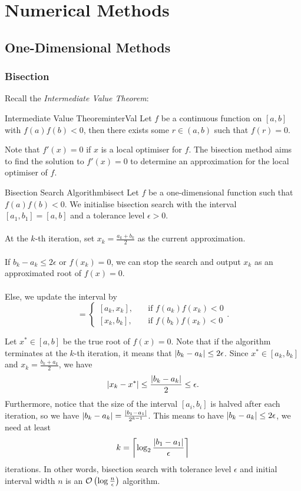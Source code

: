 \documentclass[math, code]{amznotes}
\theoremstyle{remark}
\begin{document}
\chapter{Numerical Methods}
\section{One-Dimensional Methods}
\subsection{Bisection}
Recall the \textit{Intermediate Value Theorem}:
\begin{thmbox}{Intermediate Value Theorem}{interVal}
    Let $f$ be a continuous function on $[a, b]$ with $f(a)f(b) < 0$, then there exists some $r \in (a, b)$ such that $f(r) = 0$.
\end{thmbox}
Note that $f'(x) = 0$ if $x$ is a local optimiser for $f$. The bisection method aims to find the solution to $f'(x) = 0$ to determine an approximation for the local optimiser of $f$.
\begin{tecbox}{Bisection Search Algorithm}{bisect}
    Let $f$ be a one-dimensional function such that $f(a)f(b) < 0$. We initialise bisection search with the interval $[a_1, b_1] = [a, b]$ and a tolerance level $\epsilon > 0$.
    \\\\
    At the $k$-th iteration, set $x_k = \frac{a_k + b_k}{2}$ as the current approximation. 
    \\\\
    If $b_k - a_k \leq 2\epsilon$ or $f(x_k) = 0$, we can stop the search and output $x_k$ as an approximated root of $f(x) = 0$.
    \\\\
    Else, we update the interval by
    \begin{equation*}
        [a_{k + 1}, b_{k + 1}] = \begin{cases}
            [a_k, x_k], & \quad\textrm{if } f(a_k)f(x_k) < 0 \\
            [x_k, b_k], & \quad\textrm{if } f(b_k)f(x_k) < 0
        \end{cases}.
    \end{equation*} 
\end{tecbox}
Let $x^* \in [a, b]$ be the true root of $f(x) = 0$. Note that if the algorithm terminates at the $k$-th iteration, it means that ${\left\lvert {b_k - a_k} \right\rvert} \leq 2\epsilon$. Since $x^* \in [a_k, b_k]$ and $x_k = \frac{b_k + a_k}{2}$, we have
\begin{equation*}
    {\left\lvert {x_k - x^*} \right\rvert} \leq \frac{{\left\lvert {b_k - a_k} \right\rvert}}{2} \leq \epsilon.
\end{equation*}
Furthermore, notice that the size of the interval $[a_i, b_i]$ is halved after each iteration, so we have ${\left\lvert {b_k - a_k} \right\rvert} = \frac{{\left\lvert {b_1 - a_1} \right\rvert}}{2^{k - 1}}$. This means to have ${\left\lvert {b_k - a_k} \right\rvert} \leq 2\epsilon$, we need at least
\begin{equation*}
    k = \left\lceil\log_2\frac{{\left\lvert {b_1 - a_1} \right\rvert}}{\epsilon}\right\rceil
\end{equation*}
iterations. In other words, bisection search with tolerance level $\epsilon$ and initial interval width $n$ is an $\mathcal{O}\left(\log\frac{n}{\epsilon}\right)$ algorithm.
\end{document}
